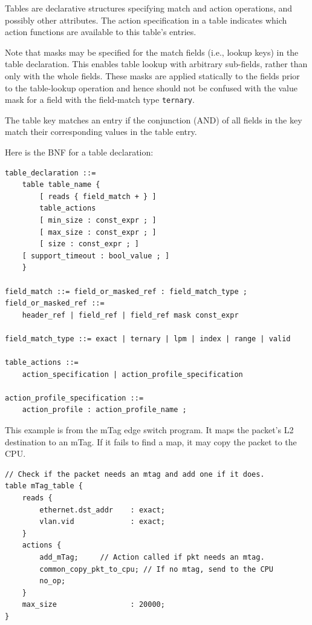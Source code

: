 \documentclass[12pt]{article}
\begin{document}
Tables are declarative structures specifying match and action operations, and
possibly other attributes. The action specification in a table indicates which
action functions are available to this table's entries.

Note that masks may be specified for the match fields (i.e., lookup keys) in the 
table declaration. This enables table lookup with arbitrary sub-fields, rather 
than only with the whole fields. These masks are applied statically to the fields
prior to the table-lookup operation and hence should not be confused with 
the value mask for a field with the field-match type \texttt{ternary}.

The table key matches an entry if the conjunction (AND) of all fields in
the key match their corresponding values in the table entry.

Here is the BNF for a table declaration:

\begin{lstlisting}[style=BNFstyle]
table_declaration ::=
    table table_name {
        [ reads { field_match + } ]
        table_actions
        [ min_size : const_expr ; ]
        [ max_size : const_expr ; ]
        [ size : const_expr ; ]
	[ support_timeout : bool_value ; ]
    }

field_match ::= field_or_masked_ref : field_match_type ;
field_or_masked_ref ::= 
    header_ref | field_ref | field_ref mask const_expr

field_match_type ::= exact | ternary | lpm | index | range | valid

table_actions ::= 
    action_specification | action_profile_specification

action_profile_specification ::= 
    action_profile : action_profile_name ;
\end{lstlisting}

This example is from the mTag edge switch program.  It maps the packet's 
L2 destination to an mTag. If it fails to find a map, it may copy the packet 
to the CPU.

\begin{lstlisting}[style=P4style]
// Check if the packet needs an mtag and add one if it does.
table mTag_table {
    reads {
        ethernet.dst_addr    : exact;
        vlan.vid             : exact;
    }
    actions {
        add_mTag;     // Action called if pkt needs an mtag.
        common_copy_pkt_to_cpu; // If no mtag, send to the CPU
        no_op;
    }
    max_size                 : 20000;
}
\end{lstlisting}
\end{document}

